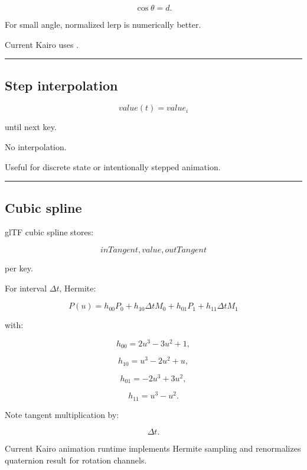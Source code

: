 \[
\cos\theta=d.
\]

For small angle, normalized lerp is numerically better.

Current Kairo uses .

\begin{center}\rule{0.5\linewidth}{0.5pt}\end{center}

\subsection{Step interpolation}\label{04-visual-computing-ii-ch041-step-interpolation}

\hypertarget{04-visual-computing-ii-ch041-step-interpolation}{}

\[
value(t)=value_i
\]

until next key.

No interpolation.

Useful for discrete state or intentionally stepped animation.

\begin{center}\rule{0.5\linewidth}{0.5pt}\end{center}

\subsection{Cubic spline}\label{04-visual-computing-ii-ch041-cubic-spline}

\hypertarget{04-visual-computing-ii-ch041-cubic-spline}{}

glTF cubic spline stores:

\[
inTangent,
value,
outTangent
\]

per key.

For interval \(\Delta t\), Hermite:

\[
P(u)
=
h_{00}P_0
+
h_{10}\Delta t M_0
+
h_{01}P_1
+
h_{11}\Delta t M_1
\]

with:

\[
h_{00}=2u^3-3u^2+1,
\]

\[
h_{10}=u^3-2u^2+u,
\]

\[
h_{01}=-2u^3+3u^2,
\]

\[
h_{11}=u^3-u^2.
\]

Note tangent multiplication by:

\[
\Delta t.
\]

Current Kairo animation runtime implements Hermite sampling and renormalizes quaternion result for rotation channels.

